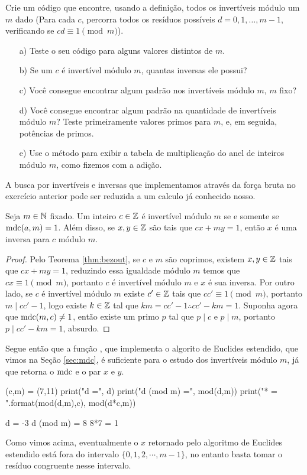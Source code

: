 \begin{exercise}
\label{ex:invers}
  Crie um código que encontre, usando a definição,
  todos os invertíveis módulo um $m$ dado (Para cada $c$,
  percorra todos os resíduos possíveis $d = 0, 1, \dots, m-1$,
  verificando se $cd \equiv 1 \pmod m$). 
  \begin{itemize}
    \item[a)] Teste o seu código para alguns valores distintos de $m$. 
    \item[b)] Se um $c$ é invertível módulo $m$, quantas
    inversas ele possui?
    \item[c)] Você consegue encontrar algum padrão
    nos invertíveis módulo $m$, $m$ fixo?
    \item[d)] Você consegue encontrar algum padrão na quantidade
    de invertíveis módulo $m$? Teste primeiramente valores primos
    para $m$, e,  em seguida, potências de primos.
    \item[e)] Use o método 
    para exibir a tabela de multiplicação do anel de inteiros módulo
    $m$, como fizemos com a adição.
  \end{itemize}
\end{exercise}

A busca por invertíveis e inversas que implementamos
através da força bruta no exercício anterior pode ser
reduzida a um calculo já conhecido nosso.

\begin{proposition}
\label{prop:inversa}
  Seja $m \in \mathbb{N}$ fixado. Um inteiro $c \in \mathbb{Z}$ é
  invertível módulo $m$ se e somente se $\operatorname{mdc}(a,m) = 1$.
  Além disso, se $x,y \in \mathbb{Z}$ são tais que
  $cx+my = 1$, então $x$ é uma inversa para $c$
  módulo $m$.
\end{proposition}
\begin{proof}
  Pelo Teorema \ref{thm:bezout}, se $c$ e $m$ são coprimos,
  existem $x,y \in \mathbb{Z}$ tais que $cx + my = 1$, reduzindo
  essa igualdade módulo $m$ temos que $cx \equiv 1 \pmod m$,
  portanto $c$ é invertível módulo $m$ e $x$ é sua 
  inversa. Por outro lado, se $c$ é invertível módulo $m$ 
  existe $c' \in \mathbb{Z}$ tais que $cc' \equiv 1 \pmod m$, portanto
  $m \mid cc' - 1$, logo existe $k \in \mathbb{Z}$ tal que
  $km = cc' - 1 \therefore cc' - km = 1$. Suponha agora
  que $\operatorname{mdc}(m,c)\neq 1$,
  então existe um primo $p$ tal que $p\mid c$ e $p\mid m$,
  portanto $p \mid cc'-km = 1$, absurdo.
\end{proof}

Segue então que a função , que implementa o
algorito de Euclides estendido, que vimos na Seção
\ref{sec:mdc}, é suficiente para o estudo dos invertíveis módulo
$m$, já que retorna o $\operatorname{mdc}$ e o par $x$ e $y$.
\begin{sageinput}
(c,m) = (7,11)
print("d =", d)
print("d (mod m) =", mod(d,m))
print("{}*{} = ".format(mod(d,m),c), mod(d*c,m))
\end{sageinput}
\begin{sageoutput}
d = -3
d (mod m) = 8
8*7 =  1
\end{sageoutput} 
Como vimos acima, eventualmente o $x$ retornado pelo
algoritmo de Euclides estendido está fora
do intervalo $\{0,1,2,\cdots, m-1\}$, no 
entanto basta tomar o resíduo congruente nesse intervalo.


